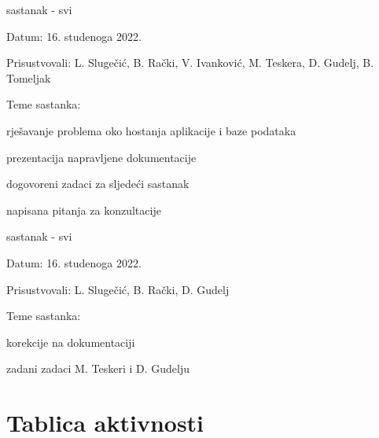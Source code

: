 \begin{packed_enum}
			\item  sastanak - svi
			\item[] \begin{packed_item}
				\item Datum: 16. studenoga 2022.
				\item Prisustvovali: 
                L. Slugečić, B. Rački, V. Ivanković, M. Teskera, D. Gudelj, B. Tomeljak
				\item Teme sastanka:
				\begin{packed_item}
					\item 
                    rješavanje problema oko hostanja aplikacije i baze podataka
					\item 
                    prezentacija napravljene dokumentacije
                    \item
                    dogovoreni zadaci za sljedeći sastanak
                    \item
                    napisana pitanja za konzultacije
				
				\end{packed_item}
			\end{packed_item}
			
			\item  sastanak - svi
			\item[] \begin{packed_item}
				\item Datum: 16. studenoga 2022.
				\item Prisustvovali: 
                L. Slugečić, B. Rački, D. Gudelj
				\item Teme sastanka:
				\begin{packed_item}
					\item 
                    korekcije na dokumentaciji 
                    \item
                    zadani zadaci M. Teskeri i D. Gudelju
				
				\end{packed_item}
			\end{packed_item}
			
		\end{packed_enum}
		
		\eject
		\section*{Tablica aktivnosti}
		


